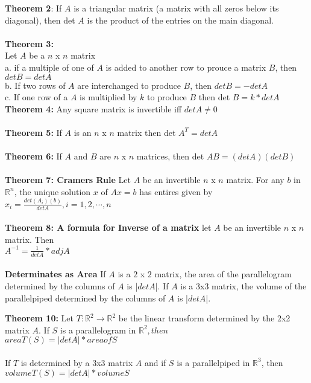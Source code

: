 \documentclass[14pt]{extreport}
\begin{document}
\textbf{Theorem 2}: If $A$ is a triangular matrix (a matrix with all zeros below its diagonal), then det $A$ is the product of the entries on the main diagonal.\\\\

\textbf{Theorem 3:}\\
Let $A$ be a $n$ x $n$ matrix\\
a. if a multiple of one of $A$ is added to another row to prouce a matrix $B$, then $det B = det A$\\
b. If two rows of $A$ are interchanged to produce $B$, then $det B = -det A$\\
c. If one row of a $A$ is multiplied by $k$ to produce $B$ then det $B = k * det A$\\

\textbf{Theorem 4:} Any square matrix is invertible iff $det A \ne 0$\\\\

\textbf{Theorem 5:} If $A$ is an $n$ x $n$ matrix then det $A^T = det A$\\\\

\textbf{Theorem 6:} If $A$ and $B$ are $n$ x $n$ matrices, then det $AB = (det A)(det B)$\\\\


\textbf{Theorem 7: Cramers Rule} Let $A$ be an invertible $n$ x $n$ matrix. For any $b$ in $\mathbb{R}^n$, the unique solution $x$ of $Ax = b$ has entires given by\\
$x_i = \frac{det(A_i)(b)}{det A}, i = 1, 2, \cdots, n$\\\\


\textbf{Theorem 8: A formula for Inverse of a matrix} let $A$ be an invertible $n$ x $n$ matrix. Then\\

$A^{-1} = \frac{1}{det A}*adj A$\\\\

\textbf{Determinates as Area} If $A$ is a $2$ x $2$ matrix, the area of the parallelogram determined by the columns of $A$ is |$det A$|. If $A$ is a 3x3 matrix, the volume
of the parallelpiped determined by the columns of $A$ is |$det A$|.

\textbf{Theorem 10: } Let $T: \mathbb{R}^2 \to \mathbb{R}^2$ be the linear transform determined by the 2x2 matrix $A$.
If $S$ is a parallelogram in $\mathbb{R}^2, then$\\
	${area T(S)} = |det A| * {area of S}$ \\\\
If $T$ is determined by a 3x3 matrix $A$ and if $S$ is a parallelpiped in $\mathbb{R}^3$, then\\
	${volume T(S)} = |det A| * {volume S}$\\\\
\end{document}
